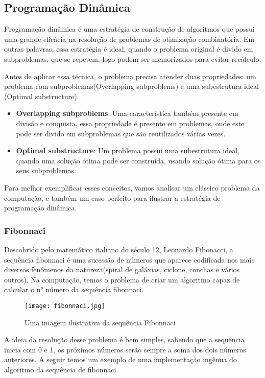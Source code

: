 
  \subsection{Programação Dinâmica}

    Programação dinâmica é uma estratégia de construção de algoritmos que 
    possui uma grande eficácia na resolução de problemas de otimização combinatória.
    Em outras palavras, essa estratégia é ideal, quando o problema original 
    é divido em subproblemas, que se repetem, logo podem ser memorizados para 
    evitar recálculo.

    Antes de aplicar essa técnica, o problema precisa atender duas propriedades:
    um problema com subproblemas(Overlapping subproblems) e uma subestrutura ideal
    (Optimal substructure).

    \begin{itemize}
      \item \textbf{Overlapping subproblems}: Uma característica também presente em divisão 
      e conquista, essa propriedade é presente em problemas, onde este pode ser 
      divido em subproblemas que são reutilizados várias vezes.
      \item \textbf{Optimal substructure}: Um problema possui uma subestrutura ideal, quando 
      uma solução ótima pode ser construída, usando solução ótima para os seus subproblemas.
    \end{itemize}

    Para melhor exemplificar esses conceitos, vamos analisar um clássico problema da computação, 
    e também um caso perfeito para ilustrar a estratégia de programação dinâmica.

    \subsubsection{Fibonnaci}

    Descobrido pelo matemático italiano do século 12, Leonardo Fibonacci, a sequência 
    fibonnaci é uma sucessão de números que aparece codificada nos mais diversos fenômenos 
    da natureza(spiral de galáxias, ciclone, conchas e vários outros). Na computação, temos 
    o problema de criar um algoritmo capaz de calcular o n° número da sequência fibonnaci.

    \begin{figure}[ht]
      \centering
      \texttt{[image: fibonnaci.jpg]}
      \caption{Uma imagem ilustrativa da sequência Fibonnaci}
      \label{fig:fibonnaci}
    \end{figure}

    A ideia da resolução desse problema é bem simples, sabendo que a sequência inicia com 0 e 1, os
    próximos números serão sempre a soma dos dois números anteriores. A seguir temos um exemplo 
    de uma implementação ingênua do algoritmo da sequência de fibonnaci. 



    